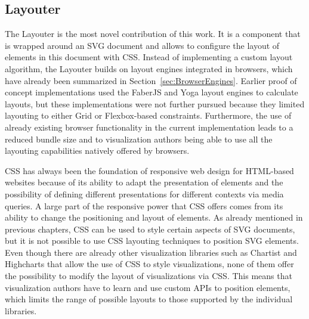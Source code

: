 \subsection{Layouter}

The Layouter is the most novel contribution of this work.
It is a component that is wrapped around an SVG document and allows to configure the layout of elements in this document with CSS.
Instead of implementing a custom layout algorithm, the Layouter builds on layout engines integrated in browsers, which have already been summarized in Section~\ref{sec:BrowserEngines}.
Earlier proof of concept implementations used the FaberJS \parencite{FaberJS} and Yoga \parencite{Yoga} layout engines to calculate layouts, but these implementations were not further pursued because they limited layouting to either Grid or Flexbox-based constraints.
Furthermore, the use of already existing browser functionality in the current implementation leads to a reduced bundle size and to visualization authors being able to use all the layouting capabilities natively offered by browsers.

CSS has always been the foundation of responsive web design for HTML-based websites because of its ability to adapt the presentation of elements and the possibility of defining different presentations for different contexts via media queries.
A large part of the responsive power that CSS offers comes from its ability to change the positioning and layout of elements.
As already mentioned in previous chapters, CSS can be used to style certain aspects of SVG documents, but it is not possible to use CSS layouting techniques to position SVG elements.
Even though there are already other visualization libraries such as Chartist \parencite{Chartist} and Highcharts \parencite{Highcharts} that allow the use of CSS to style visualizations, none of them offer the possibility to modify the layout of visualizations via CSS.
This means that visualization authors have to learn and use custom APIs to position elements, which limits the range of possible layouts to those supported by the individual libraries. 

